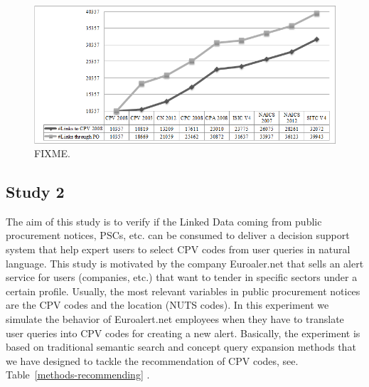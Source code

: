 % 
%  
 \begin{figure}[!ht]
\centering
	\includegraphics[width=\textwidth]{./imgs/fig-3}
 \caption{FIXME.}
 \label{fig:results-3}
\end{figure}


\subsection{Study 2}
The aim of this study is to verify if the Linked Data coming from public procurement notices, PSCs, etc. can be consumed to deliver a decision support system that help expert 
users to select CPV codes from user queries in natural language. This study is motivated by the company Euroaler.net that sells an alert service for users (companies, etc.) 
that want to tender in specific sectors under a certain profile. Usually, the most relevant variables in public procurement notices are the CPV codes and the 
location (NUTS codes). In this experiment we simulate the behavior of Euroalert.net employees when they have to translate user queries into CPV codes 
for creating a new alert. Basically, the experiment is based on traditional semantic search and concept query expansion methods that we have designed to 
tackle the recommendation of CPV codes, see. Table~\ref{methods-recommending} . 



